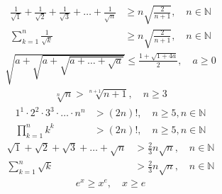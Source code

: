 \documentclass[a4paper,11pt]{article}
\begin{document}
\vspace{13pt}
\begin{equation}
    \begin{aligned}
        \frac{1}{\sqrt{1}} + \frac{1}{\sqrt{2}} + \frac{1}{\sqrt{3}} + \dots + \frac{1}{\sqrt{n}} &\geq n\sqrt{\frac{2}{n+1}}, \quad n\in\mathbb{N} \\
        \sum_{k=1}^n \frac{1}{\sqrt{k}} &\geq n\sqrt{\frac{2}{n+1}}, \quad n\in\mathbb{N}
    \end{aligned}
\end{equation}
\vspace{13pt}
\begin{equation}
    \begin{aligned}
        \sqrt{a+\sqrt{a+\sqrt{a+\dots+\sqrt{a}}}} \leq \frac{1+\sqrt{1+4a}}{2}, \quad a\geq0
    \end{aligned}
\end{equation}
\vspace{13pt}
\begin{equation}
    \begin{aligned}
        \sqrt[n]{n} > \sqrt[n+1]{n+1}, \quad n\geq3
    \end{aligned}
\end{equation}
\vspace{13pt}
\begin{equation}
    \begin{aligned}
        1^1\cdot2^2\cdot3^3\cdot\ldots\cdot n^n &> (2n)!, \quad n\geq5,n\in\mathbb{N} \\
        \prod_{k=1}^n k^k &> (2n)!, \quad n\geq5,n\in\mathbb{N}
    \end{aligned}
\end{equation}
\vspace{13pt}
\begin{equation}
    \begin{aligned}
        \sqrt{1} + \sqrt{2} + \sqrt{3} + \dots + \sqrt{n} &> \frac{2}{3}n\sqrt{n}, \quad n\in\mathbb{N} \\
        \sum_{k=1}^n \sqrt{k} &> \frac{2}{3}n\sqrt{n}, \quad n\in\mathbb{N}
    \end{aligned}
\end{equation}
\vspace{13pt}
\begin{equation}
    \begin{aligned}
        e^x \geq x^e, \quad x\geq e
    \end{aligned}
\end{equation}
\vspace{13pt}
\end{document}
